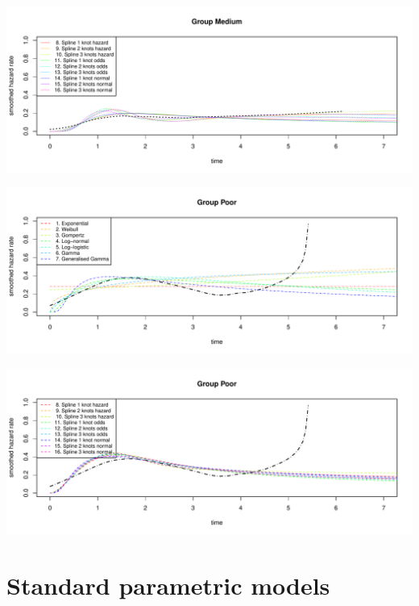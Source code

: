 \documentclass[]{article}
\begin{document}
\begin{flushleft}\includegraphics[height=0.29\textheight]{Images/plot_haz_pred-4} \end{flushleft}

\begin{flushleft}\includegraphics[height=0.29\textheight]{Images/plot_haz_pred-5} \end{flushleft}

\begin{flushleft}\includegraphics[height=0.29\textheight]{Images/plot_haz_pred-6} \end{flushleft}

\newpage

\section{Standard parametric models}\label{standard-parametric-models}
\end{document}
